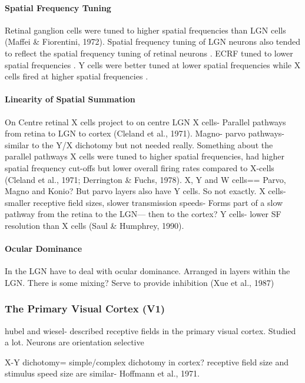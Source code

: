 \paragraph{Spatial Frequency Tuning}
Retinal ganglion cells were tuned to higher spatial frequencies than LGN cells (Maffei \& Fiorentini, 1972). Spatial frequency tuning of LGN neurons also tended to reflect the spatial frequency tuning of retinal neurons \cite{So1981}. ECRF tuned to lower spatial frequencies \cite{Sun2004}. Y cells were better tuned at lower spatial frequencies while X cells fired at higher spatial frequencies \cite{Lehmkuhle1980}.

\paragraph{Linearity of Spatial Summation}
On Centre retinal X cells project to on centre LGN X cells- Parallel pathways from retina to LGN to cortex (Cleland et al., 1971). Magno- parvo pathways- similar to the Y/X dichotomy but not needed really. Something about the parallel pathways X cells were tuned to higher spatial frequencies, had higher spatial frequency cut-offs but lower overall firing rates compared to X-cells (Cleland et al., 1971; Derrington \& Fuchs, 1978). X, Y and W cells== Parvo, Magno and Konio? But parvo layers also have Y cells. So not exactly. X cells- smaller receptive field sizes, slower transmission speeds- Forms part of a slow pathway from the retina to the LGN--- then to the cortex? Y cells- lower SF resolution than X cells (Saul \& Humphrey, 1990).

\paragraph{Ocular Dominance}  

In the LGN have to deal with ocular dominance. Arranged in layers within the LGN. There is some mixing? Serve to provide inhibition (Xue et al., 1987)

\subsubsection{The Primary Visual Cortex (V1)}

hubel and wiesel- described receptive fields in the primary visual cortex. Studied a lot. Neurons are orientation selective

X-Y dichotomy= simple/complex dichotomy in cortex? receptive field size and stimulus speed size are similar- Hoffmann et al., 1971.


